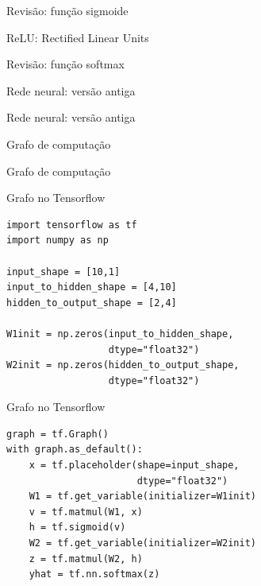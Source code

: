 \documentclass[10pt]{beamer}
\begin{document}
\begin{frame}[fragile]{Revisão: função sigmoide}

\end{frame}

\begin{frame}[fragile]{ReLU: Rectified Linear Units}

\end{frame}

\begin{frame}[fragile]{Revisão: função softmax}

\end{frame}

\begin{frame}[fragile]{Rede neural: versão antiga}

\end{frame}

\begin{frame}[fragile]{Rede neural: versão antiga}

\end{frame}

%

\begin{frame}[fragile]{Grafo de computação}

\end{frame}

\begin{frame}[fragile]{Grafo de computação}

\end{frame}

\begin{frame}[fragile]{Grafo no Tensorflow}
\begin{verbatim}
import tensorflow as tf
import numpy as np

input_shape = [10,1]
input_to_hidden_shape = [4,10]
hidden_to_output_shape = [2,4]

W1init = np.zeros(input_to_hidden_shape,
                  dtype="float32")
W2init = np.zeros(hidden_to_output_shape,
                  dtype="float32")
\end{verbatim}
\end{frame}


\begin{frame}[fragile]{Grafo no Tensorflow}
\begin{verbatim}
graph = tf.Graph() 
with graph.as_default():
    x = tf.placeholder(shape=input_shape,
                       dtype="float32") 
    W1 = tf.get_variable(initializer=W1init)
    v = tf.matmul(W1, x)
    h = tf.sigmoid(v)
    W2 = tf.get_variable(initializer=W2init)
    z = tf.matmul(W2, h)
    yhat = tf.nn.softmax(z)
\end{verbatim}
\end{frame}
\end{document}
